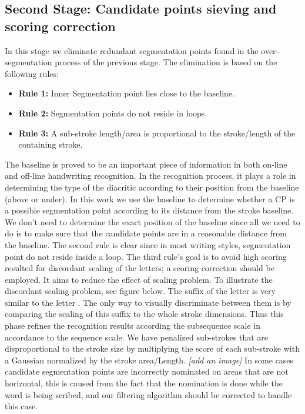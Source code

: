 \documentclass[journal,compsoc]{IEEEtran}
\begin{document}
\subsection{Second  Stage: Candidate points sieving and scoring correction}
In this stage we eliminate redundant segmentation points found in the over-segmentation process of the previous stage. The elimination is based on the following rules:

\begin{itemize}
	\item[] \textbf{Rule 1:} Inner Segmentation point lies close to the baseline. 
	\item[] \textbf{Rule 2:} Segmentation points do not reside in loops.
	\item[] \textbf{Rule 3:} A sub-stroke length/area is proportional to the stroke/length of the containing stroke.
\end{itemize}

The baseline is proved to be an important piece of information in both on-line and off-line handwriting recognition. In the recognition process, it plays a role in determining the type of the diacritic according to their position from the baseline (above or under). In this work we use the baseline to determine whether a CP is a possible segmentation point according to its distance from the stroke baseline. 
We don't need to determine the exact position of the baseline since all we need to do is to make sure that the candidate points are in a reasonable distance from the baseline.
The second rule is clear since in most writing styles, segmentation point do not reside inside a loop.
The third rule's goal is to avoid high scoring resulted for discordant scaling of the letters; a scoring correction should be employed. It aims to reduce the effect of scaling problem. To illustrate the discordant scaling problem, see figure below. The suffix of the letter  is very similar to the letter . The only way to visually discriminate between them is by comparing the scaling of this suffix to the whole stroke dimensions. Thus this phase refines the recognition results according the subsequence scale in accordance to the sequence scale. We have penalized sub-strokes that are disproportional to the stroke size by multiplying the score of each sub-stroke with a Gaussian normalized by the stroke area/Length. \emph{[add an image]}
In some cases candidate segmentation points are incorrectly nominated on areas that are not horizontal, this is caused from the fact that the nomination is done while the word is being scribed, and our filtering algorithm should be corrected to handle this case.\\
\end{document}
